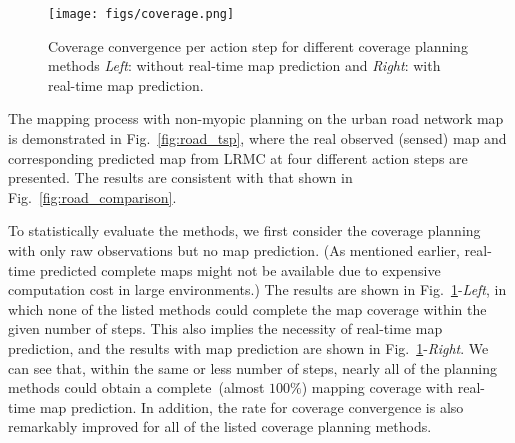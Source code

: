 \begin{figure}[t] 
  \centering
  	{\label{fig:coverage}\texttt{[image: figs/coverage.png]}}
  \caption{\small Coverage convergence per action step for different coverage planning methods \textit{Left}: without real-time map prediction and \textit{Right}: with real-time map prediction.
  } \vspace{-10pt}
\label{fig:coverage}  
\end{figure}

The mapping process with non-myopic planning on the urban road network map is demonstrated in Fig.~\ref{fig:road_tsp}, where the real observed (sensed) map and corresponding predicted map from LRMC at four different action steps are presented. The results are consistent with that shown in Fig.~\ref{fig:road_comparison}. %

To statistically evaluate the methods, we first consider the coverage planning with only raw observations but no map prediction. (As mentioned earlier, real-time predicted complete maps might not be available due to expensive computation cost in large environments.) The results are shown in Fig.~\ref{fig:coverage}-\textit{Left}, in which none of the listed methods could complete the map coverage within the given number of steps.
This also implies the necessity of real-time map prediction, 
and the results with map prediction are shown in Fig.~\ref{fig:coverage}-\textit{Right}. 
We can see that, 
within the same or less number of steps, nearly all of the planning methods could obtain a complete~(almost $100\%$) mapping coverage with real-time map prediction. 
In addition, the rate for coverage convergence is also remarkably improved for all of the listed coverage planning methods. %

